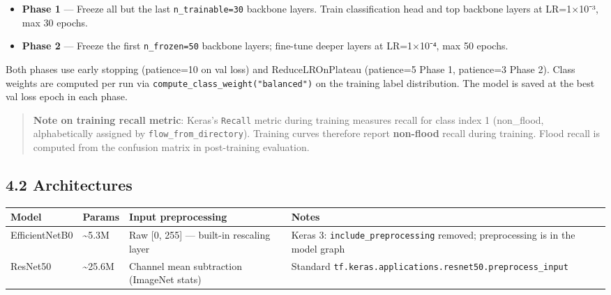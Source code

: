 \documentclass[
  11pt,
]{article}
\newcounter{none} %
\providecommand{\tightlist}{%
  \setlength{\itemsep}{0pt}\setlength{\parskip}{0pt}}
\begin{document}
\begin{itemize}
\tightlist
\item
  \textbf{Phase 1} --- Freeze all but the last \texttt{n\_trainable=30}
  backbone layers. Train classification head and top backbone layers at
  LR=1×10⁻³, max 30 epochs.
\item
  \textbf{Phase 2} --- Freeze the first \texttt{n\_frozen=50} backbone
  layers; fine-tune deeper layers at LR=1×10⁻⁴, max 50 epochs.
\end{itemize}

Both phases use early stopping (patience=10 on val loss) and
ReduceLROnPlateau (patience=5 Phase 1, patience=3 Phase 2). Class
weights are computed per run via
\texttt{compute\_class\_weight("balanced")} on the training label
distribution. The model is saved at the best val loss epoch in each
phase.

\begin{quote}
\textbf{Note on training recall metric}: Keras's \texttt{Recall} metric
during training measures recall for class index 1 (non\_flood,
alphabetically assigned by \texttt{flow\_from\_directory}). Training
curves therefore report \textbf{non-flood} recall during training. Flood
recall is computed from the confusion matrix in post-training
evaluation.
\end{quote}

\subsection{4.2 Architectures}\label{architectures}

{\def\LTcaptype{none} %
\begin{longtable}[]{@{}
  >{\raggedright\arraybackslash}p{}
  >{\raggedright\arraybackslash}p{}
  >{\raggedright\arraybackslash}p{}
  >{\raggedright\arraybackslash}p{}@{}}
\toprule\noalign{}
\begin{minipage}[b]{\linewidth}\raggedright
Model
\end{minipage} & \begin{minipage}[b]{\linewidth}\raggedright
Params
\end{minipage} & \begin{minipage}[b]{\linewidth}\raggedright
Input preprocessing
\end{minipage} & \begin{minipage}[b]{\linewidth}\raggedright
Notes
\end{minipage} \\
\midrule\noalign{}
\endhead
\bottomrule\noalign{}
\endlastfoot
EfficientNetB0 & \textasciitilde5.3M & Raw {[}0, 255{]} --- built-in
rescaling layer & Keras 3: \texttt{include\_preprocessing} removed;
preprocessing is in the model graph \\
ResNet50 & \textasciitilde25.6M & Channel mean subtraction (ImageNet
stats) & Standard
\texttt{tf.keras.applications.resnet50.preprocess\_input} \\
\end{longtable}
}
\end{document}
